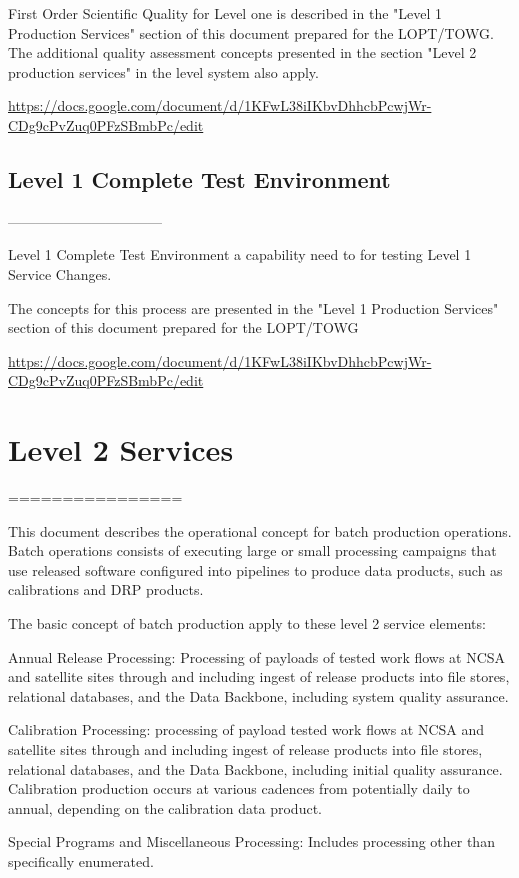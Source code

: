 First Order Scientific Quality for Level one is described in the "Level 1 Production Services" section of this document prepared for the LOPT/TOWG.
The additional quality assessment concepts presented in the section "Level 2 production services" in the level system also apply.

\url{https://docs.google.com/document/d/1KFwL38iIKbvDhhcbPcwjWr-CDg9cPvZuq0PFzSBmbPc/edit}


\subsection{Level 1 Complete Test Environment}
---------------------------------

Level 1 Complete Test Environment a capability need to for testing Level 1 Service Changes.

The concepts for this process are presented in the "Level 1 Production Services" section of this document prepared for the LOPT/TOWG

\url{https://docs.google.com/document/d/1KFwL38iIKbvDhhcbPcwjWr-CDg9cPvZuq0PFzSBmbPc/edit}


\section{ Level 2 Services}
================

This document describes the operational concept for batch production operations. Batch operations consists of executing large or small processing campaigns that use released software configured into pipelines to produce data products, such as calibrations and DRP products.

The basic concept of batch production apply to these level 2 service elements:

Annual Release Processing: Processing of payloads of tested work flows
at NCSA and satellite sites through and including ingest of release
products into file stores, relational databases, and the Data
Backbone, including system quality assurance.

Calibration Processing: processing of payload tested work flows at NCSA
and satellite sites through and including ingest of release products
into file stores, relational databases, and the Data Backbone,
including initial quality assurance. Calibration production occurs at
various cadences from potentially daily to annual, depending on the
calibration data product.

Special Programs and Miscellaneous Processing: Includes processing
other than specifically enumerated.

